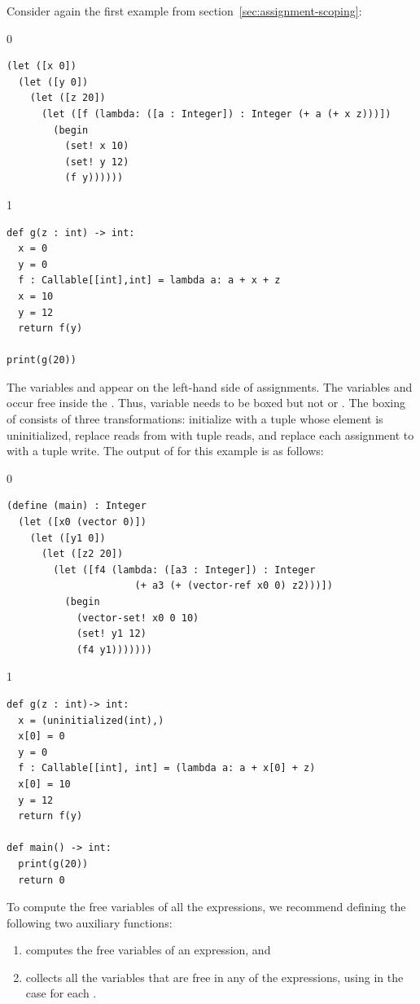 \documentclass[7x10]{TimesAPriori_MIT}%
\def\racketEd{0}
\def\pythonEd{1}
\def\edition{1}
\newcommand{\pythonColor}[0]{}
\numberwithin{theorem}{chapter}
\numberwithin{definition}{chapter}
\numberwithin{equation}{chapter}
\begin{document}
Consider again the first example from
section~\ref{sec:assignment-scoping}:
%
{\if\edition\racketEd
\begin{lstlisting}
(let ([x 0])
  (let ([y 0])
    (let ([z 20])
      (let ([f (lambda: ([a : Integer]) : Integer (+ a (+ x z)))])
        (begin
          (set! x 10)
          (set! y 12)
          (f y))))))
\end{lstlisting}
\fi}
{\if\edition\pythonEd\pythonColor
\begin{lstlisting}
def g(z : int) -> int:
  x = 0
  y = 0  
  f : Callable[[int],int] = lambda a: a + x + z
  x = 10
  y = 12
  return f(y)

print(g(20))
\end{lstlisting}
\fi}
%
\noindent The variables  and  appear on the left-hand
side of assignments.  The variables  and  occur free
inside the . Thus, variable  needs to be boxed
but not  or .  The boxing of  consists of
three transformations: initialize  with a tuple whose element
is uninitialized, replace reads from  with tuple reads, and
replace each assignment to  with a tuple write. The output of
 for this example is as follows:
%
{\if\edition\racketEd
\begin{lstlisting}
(define (main) : Integer
  (let ([x0 (vector 0)])
    (let ([y1 0])
      (let ([z2 20])
        (let ([f4 (lambda: ([a3 : Integer]) : Integer
                      (+ a3 (+ (vector-ref x0 0) z2)))])
          (begin 
            (vector-set! x0 0 10)
            (set! y1 12)
            (f4 y1)))))))
\end{lstlisting}
\fi}
%
{\if\edition\pythonEd\pythonColor
\begin{lstlisting}
def g(z : int)-> int:
  x = (uninitialized(int),)
  x[0] = 0
  y = 0
  f : Callable[[int], int] = (lambda a: a + x[0] + z)
  x[0] = 10
  y = 12
  return f(y)

def main() -> int:
  print(g(20))
  return 0
\end{lstlisting}
\fi}

To compute the free variables of all the  expressions, we
recommend defining the following two auxiliary functions:
\begin{enumerate}
\item {} computes the free variables of an expression, and
\item {} collects all the variables that are
  free in any of the  expressions, using
   in the case for each .
\end{enumerate}
\end{document}
